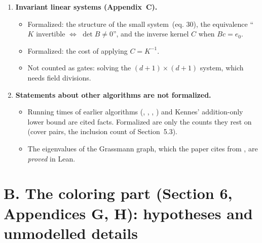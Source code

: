 \documentclass[11pt]{article}
\newcommand{\ZetaTransform}{\mathsf{Z}}
\begin{document}
\begin{enumerate}[leftmargin=1.6em]
\begin{itemize}
    \item Formalized: both transforms (with their costs over $\mathbb Q$), the table $t$, and
      the identities $a=\ZetaTransform_n t$ and $C=\ZetaTransform_n^{-1}(2^{a})$.
    \item Accounted for in the documentation only: building $t$ ($\ell$ increments) and
      $2^0,\dots,2^\ell$ ($\ell$ doublings). Indexing the list by the integer $a(U)$ is a table
      lookup, not an arithmetic operation.
  \end{itemize}
\item \textbf{Invariant linear systems (Appendix~C).}
  \begin{itemize}
    \item Formalized: the structure of the small system~(eq. 30), the equivalence
      ``$K$ invertible $\iff$ $\det B\ne0$'', and the inverse kernel $C$ when $Bc=e_0$.
    \item Formalized: the cost of applying $C=K^{-1}$.
    \item Not counted as gates: solving the $(d+1)\times(d+1)$ system, which needs field
      divisions.
  \end{itemize}
\item \textbf{Statements about other algorithms are not formalized.}
  \begin{itemize}
    \item Running times of earlier algorithms (\cite{KKW16}, \cite{MOR04}, \cite{BTV10},
      \cite{GHO13}) and Kennes' addition-only lower bound \cite{Ken92} are cited facts. Formalized are only
      the counts they rest on (cover pairs, the inclusion count of Section~5.3).
    \item The eigenvalues of the Grassmann graph, which the paper cites from \cite{Sri14,MOR04},
      are \emph{proved} in Lean.
  \end{itemize}
\end{enumerate}

\section*{B. The coloring part (Section 6, Appendices G, H): hypotheses and unmodelled details}
\end{document}
